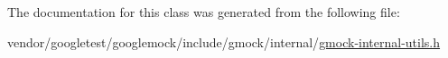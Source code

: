 The documentation for this class was generated from the following file\+:\begin{DoxyCompactItemize}
\item 
vendor/googletest/googlemock/include/gmock/internal/\hyperlink{gmock-internal-utils_8h}{gmock-\/internal-\/utils.\+h}\end{DoxyCompactItemize}
